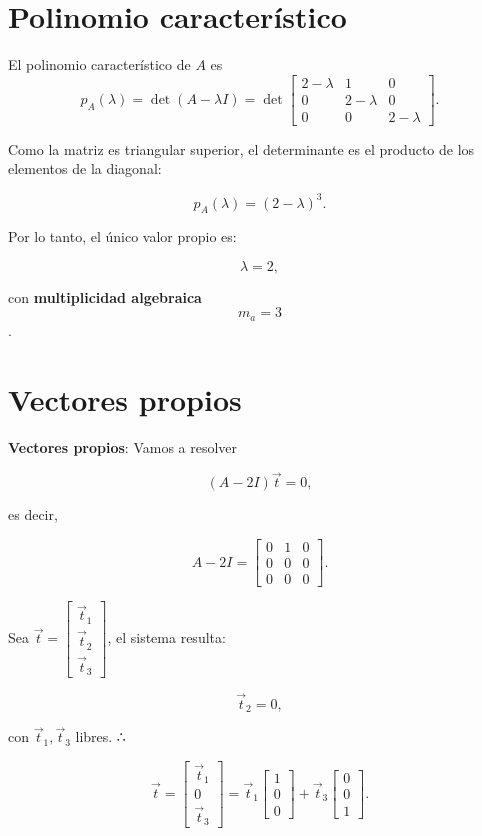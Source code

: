 \documentclass[
  letterpaper,
  DIV=11,
  numbers=noendperiod]{scrreprt}
\begin{document}
\section{Polinomio característico}\label{polinomio-caracteruxedstico}

El polinomio característico de \(A\) es \[
p_A(\lambda) = \det(A - \lambda I)
= \det
\begin{bmatrix}
2 - \lambda & 1 & 0\\
0 & 2 - \lambda & 0\\
0 & 0 & 2 - \lambda
\end{bmatrix}.
\]

Como la matriz es triangular superior, el determinante es el producto de
los elementos de la diagonal:

\[
p_A(\lambda) = (2 - \lambda)^3.
\]

Por lo tanto, el único valor propio es:

\[
\lambda = 2,
\]

con \textbf{multiplicidad algebraica} \[m_a = 3\].

\section{Vectores propios}\label{vectores-propios}

\textbf{Vectores propios}: Vamos a resolver

\[
(A - 2I)\vec{t} = 0,
\]

es decir,

\[
A - 2I =
\begin{bmatrix}
0 & 1 & 0\\
0 & 0 & 0\\
0 & 0 & 0
\end{bmatrix}.
\]

Sea
\(\vec{t} = \begin{bmatrix} \vec{t}_1 \\ \vec{t}_2 \\ \vec{t}_3 \end{bmatrix}\),
el sistema resulta:

\[
\vec{t}_2 = 0,
\]

con \(\vec{t}_1, \vec{t}_3\) libres. ∴

\[
\vec{t} =
\begin{bmatrix}
\vec{t}_1\\
0\\
\vec{t}_3
\end{bmatrix}
= \vec{t}_1
\begin{bmatrix}
1\\
0\\
0
\end{bmatrix}
+ \vec{t}_3
\begin{bmatrix}
0\\
0\\
1
\end{bmatrix}.
\]
\end{document}
